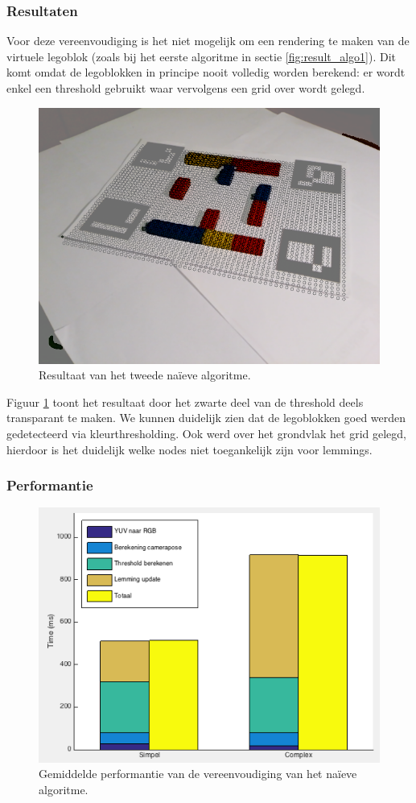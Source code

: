 \subsubsection*{Resultaten}
Voor deze vereenvoudiging is het niet mogelijk om een rendering te maken van de virtuele legoblok (zoals bij het eerste algoritme in sectie \ref{fig:result_algo1}). Dit komt omdat de legoblokken in principe nooit volledig worden berekend: er wordt enkel een threshold gebruikt waar vervolgens een grid over wordt gelegd.

\begin{figure}
  \centering
  \includegraphics[width=.5\linewidth]{img/alg2}
  \caption{Resultaat van het tweede na\"ieve algoritme.}
  \label{fig:algo2_res}
\end{figure}

Figuur \ref{fig:algo2_res} toont het resultaat door het zwarte deel van de threshold deels transparant te maken. We kunnen duidelijk zien dat de legoblokken goed werden gedetecteerd via kleurthresholding. Ook werd over het grondvlak het grid gelegd, hierdoor is het duidelijk welke nodes niet toegankelijk zijn voor lemmings.

\subsubsection*{Performantie}

\begin{figure}
  \centering
  \includegraphics[width=.75\linewidth]{img/naiveVereenvPerf}
  \caption{Gemiddelde performantie van de vereenvoudiging van het na\"ieve algoritme.}
  \label{fig:naive_vereenv_perf}
\end{figure}

